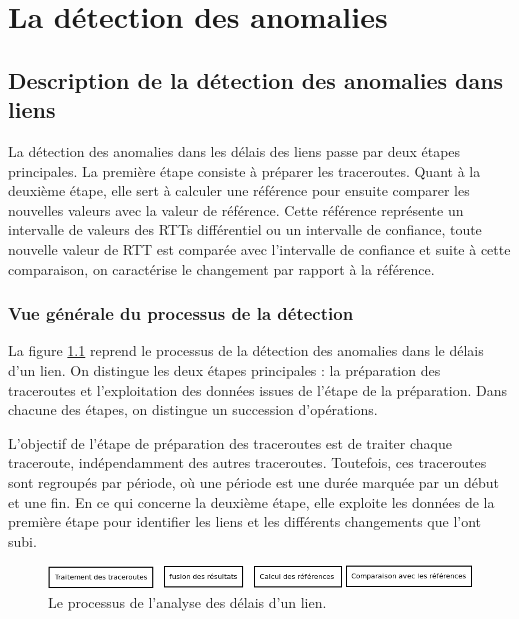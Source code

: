 \chapter{La détection des anomalies}



\section{Description de la détection des anomalies dans liens}

La détection des anomalies dans les délais des liens passe par deux étapes principales. La première étape consiste à préparer les traceroutes. Quant à la deuxième étape, elle sert à calculer une référence pour ensuite comparer les nouvelles valeurs avec la valeur de référence. Cette  référence représente un intervalle de valeurs des RTTs différentiel ou un intervalle de confiance, toute nouvelle valeur de RTT est comparée avec l'intervalle de confiance et suite à cette comparaison, on caractérise le changement par rapport à la référence.  

\subsection{Vue générale du processus de la détection}

 La figure 	\ref{fig:process-detection} reprend le processus de la détection des anomalies dans le délais d'un lien. On distingue les deux étapes principales : la préparation des traceroutes et l'exploitation des données issues de l'étape de la préparation.  Dans chacune des étapes, on distingue un succession d'opérations. 
 
 L'objectif de l'étape de préparation des traceroutes est de traiter chaque traceroute, indépendamment des autres traceroutes. Toutefois, ces traceroutes sont regroupés par période, où une période est une durée marquée par un début et une fin. En ce qui concerne la deuxième étape, elle exploite les données de la première étape pour identifier les liens et les différents changements que l'ont subi.
  
\begin{figure}[H]
	\centering
	\includegraphics[width=1\linewidth]{illustrations/process-detection}
	\caption{Le processus de l'analyse des délais d'un lien.}
	\label{fig:process-detection}
\end{figure}

